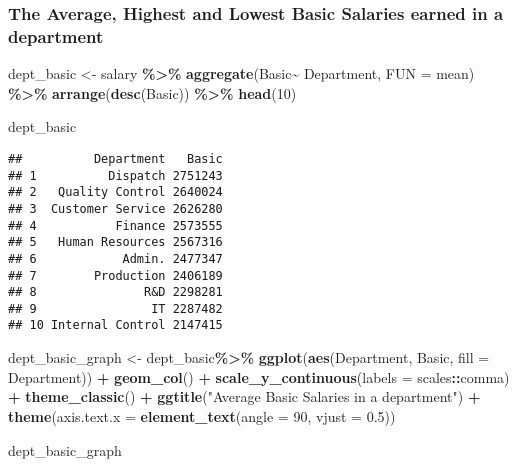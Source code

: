 \documentclass[
]{article}
\newenvironment{Shaded}{\begin{snugshade}}{\end{snugshade}}
\newcommand{\AttributeTok}[1]{\textcolor[rgb]{0.13,0.29,0.53}{#1}}
\newcommand{\DecValTok}[1]{\textcolor[rgb]{0.00,0.00,0.81}{#1}}
\newcommand{\FloatTok}[1]{\textcolor[rgb]{0.00,0.00,0.81}{#1}}
\newcommand{\FunctionTok}[1]{\textcolor[rgb]{0.13,0.29,0.53}{\textbf{#1}}}
\newcommand{\NormalTok}[1]{#1}
\newcommand{\OtherTok}[1]{\textcolor[rgb]{0.56,0.35,0.01}{#1}}
\newcommand{\SpecialCharTok}[1]{\textcolor[rgb]{0.81,0.36,0.00}{\textbf{#1}}}
\newcommand{\StringTok}[1]{\textcolor[rgb]{0.31,0.60,0.02}{#1}}
\begin{document}
\subsubsection{The Average, Highest and Lowest Basic Salaries earned in
a
department}\label{the-average-highest-and-lowest-basic-salaries-earned-in-a-department}

\begin{Shaded}
\begin{Highlighting}[]
\NormalTok{dept\_basic }\OtherTok{\textless{}{-}}\NormalTok{ salary }\SpecialCharTok{\%\textgreater{}\%} 
  \FunctionTok{aggregate}\NormalTok{(Basic}\SpecialCharTok{\textasciitilde{}}\NormalTok{ Department,}
            \AttributeTok{FUN =}\NormalTok{ mean) }\SpecialCharTok{\%\textgreater{}\%} 
  \FunctionTok{arrange}\NormalTok{(}\FunctionTok{desc}\NormalTok{(Basic)) }\SpecialCharTok{\%\textgreater{}\%} 
  \FunctionTok{head}\NormalTok{(}\DecValTok{10}\NormalTok{)}

\NormalTok{dept\_basic}
\end{Highlighting}
\end{Shaded}

\begin{verbatim}
##          Department   Basic
## 1          Dispatch 2751243
## 2   Quality Control 2640024
## 3  Customer Service 2626280
## 4           Finance 2573555
## 5   Human Resources 2567316
## 6            Admin. 2477347
## 7        Production 2406189
## 8               R&D 2298281
## 9                IT 2287482
## 10 Internal Control 2147415
\end{verbatim}

\begin{Shaded}
\begin{Highlighting}[]
\NormalTok{dept\_basic\_graph }\OtherTok{\textless{}{-}}\NormalTok{ dept\_basic}\SpecialCharTok{\%\textgreater{}\%} 
  \FunctionTok{ggplot}\NormalTok{(}\FunctionTok{aes}\NormalTok{(Department,}
\NormalTok{             Basic,}
             \AttributeTok{fill =}\NormalTok{ Department)) }\SpecialCharTok{+} 
  \FunctionTok{geom\_col}\NormalTok{() }\SpecialCharTok{+}
  \FunctionTok{scale\_y\_continuous}\NormalTok{(}\AttributeTok{labels =}\NormalTok{ scales}\SpecialCharTok{::}\NormalTok{comma)  }\SpecialCharTok{+} 
  \FunctionTok{theme\_classic}\NormalTok{() }\SpecialCharTok{+} 
  \FunctionTok{ggtitle}\NormalTok{(}\StringTok{"Average Basic Salaries in a department"}\NormalTok{) }\SpecialCharTok{+} 
  \FunctionTok{theme}\NormalTok{(}\AttributeTok{axis.text.x =} \FunctionTok{element\_text}\NormalTok{(}\AttributeTok{angle =} \DecValTok{90}\NormalTok{, }\AttributeTok{vjust =} \FloatTok{0.5}\NormalTok{))}

\NormalTok{dept\_basic\_graph}
\end{Highlighting}
\end{Shaded}
\end{document}
